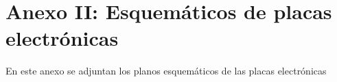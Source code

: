 \chapter*{Anexo II: Esquemáticos de placas electrónicas}
\pagestyle{especial}
{}

En este anexo se adjuntan los planos esquemáticos de las placas electrónicas 

